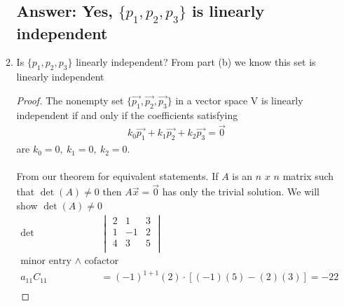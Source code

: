 \documentclass[12pt]{article}
\begin{document}
\begin{enumerate}
\begin{enumerate}
                            \subsection{Answer: Yes, $\{p_1,p_2,p_3\}$ is linearly independent}
                      \item Is $\{p_1,p_2,p_3\}$ linearly independent?
                            From part (b) we know this set is linearly independent
                            \begin{proof}
                                    The nonempty set $\{\vec{p_{1}},\vec{p_{2}},\vec{p_{3}}\}$
                                    in a vector space V is linearly independent if and only if the
                                    coefficients satisfying
                                    \begin{align*}
                                            k_{0}\vec{p_{1}} + k_{1}\vec{p_{2}} + k_{2}\vec{p_{3}} = \vec{0}
                                    \end{align*}
                                    are $k_{0} = 0,\ k_{1} = 0,\ k_{2} = 0$. \\\\
                                    From our theorem for equivalent statements.
                                    If $A$ is an $n$ $x$ $n$ matrix such that $\det(A)\neq0$ then $A\vec{x}=\vec{0}$ has only the trivial solution.
                                    We will show $\det(A)\neq0$
                                    \begin{align*}
                                            \det
                                                         &
                                            \begin{vmatrix}
                                                    2 & 1  & 3 \\
                                                    1 & -1 & 2 \\
                                                    4 & 3  & 5 \\
                                            \end{vmatrix}
                                            \\
                                            \textrm{minor entry $\land$ cofactor}                           \\
                                            a_{11}C_{11} & = (-1)^{1+1}(2)\cdot[(-1)(5)-(2)(3)] = -22       \\

\end{align*}
\end{proof}
\end{enumerate}
\end{enumerate}
\end{document}
